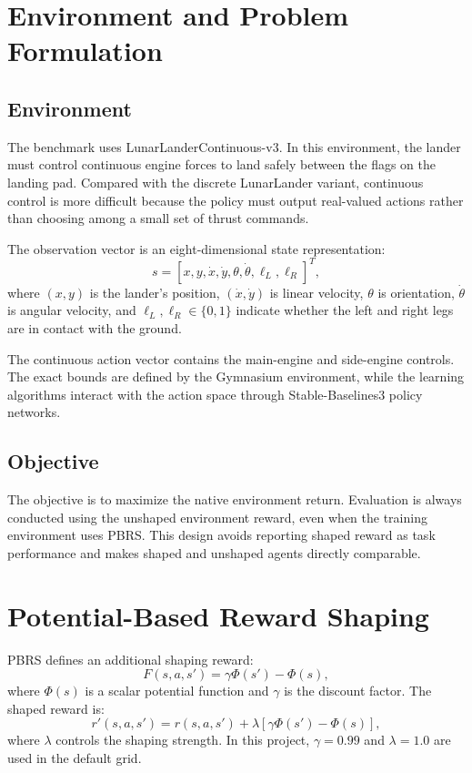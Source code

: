 \documentclass[conference,10pt]{IEEEtran}
\begin{document}
\section{Environment and Problem Formulation}
\subsection{Environment}
The benchmark uses LunarLanderContinuous-v3. In this environment, the lander must control continuous engine forces to land safely between the flags on the landing pad. Compared with the discrete LunarLander variant, continuous control is more difficult because the policy must output real-valued actions rather than choosing among a small set of thrust commands.

The observation vector is an eight-dimensional state representation:
\begin{equation}
    s = [x, y, \dot{x}, \dot{y}, \theta, \dot{\theta}, \ell_L, \ell_R]^T,
\end{equation}
where $(x,y)$ is the lander's position, $(\dot{x},\dot{y})$ is linear velocity, $\theta$ is orientation, $\dot{\theta}$ is angular velocity, and $\ell_L, \ell_R \in \{0,1\}$ indicate whether the left and right legs are in contact with the ground.

The continuous action vector contains the main-engine and side-engine controls. The exact bounds are defined by the Gymnasium environment, while the learning algorithms interact with the action space through Stable-Baselines3 policy networks.

\subsection{Objective}
The objective is to maximize the native environment return. Evaluation is always conducted using the unshaped environment reward, even when the training environment uses PBRS. This design avoids reporting shaped reward as task performance and makes shaped and unshaped agents directly comparable.

\section{Potential-Based Reward Shaping}
PBRS defines an additional shaping reward:
\begin{equation}
    F(s,a,s') = \gamma \Phi(s') - \Phi(s),
\end{equation}
where $\Phi(s)$ is a scalar potential function and $\gamma$ is the discount factor. The shaped reward is:
\begin{equation}
    r'(s,a,s') = r(s,a,s') + \lambda[\gamma\Phi(s') - \Phi(s)],
\end{equation}
where $\lambda$ controls the shaping strength. In this project, $\gamma=0.99$ and $\lambda=1.0$ are used in the default grid.
\end{document}
